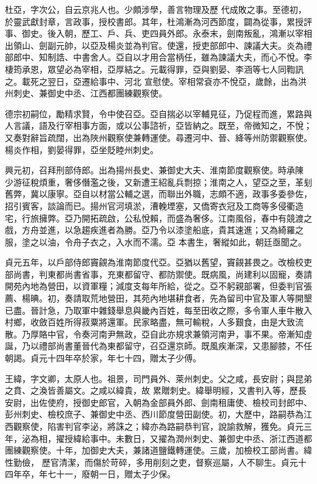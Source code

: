 \begin{pinyinscope}
 杜亞，字次公，自云京兆人也。少頗涉學，善言物理及歷
 代成敗之事。至德初，於靈武獻封章，言政事，授校書郎。其年，杜鴻漸為河西節度，闢為從事，累授評事、御史。後入朝，歷工、戶、兵、吏四員外郎。永泰末，劍南叛亂，鴻漸以宰相出領山、劍副元帥，以亞及楊炎並為判官。使還，授吏部郎中、諫議大夫。炎為禮部郎中、知制誥、中書舍人。亞自以才用合當柄任，雖為諫議大夫，而心不悅。李棲筠承恩，眾望必為宰相，亞厚結之。元載得罪，亞與劉晏、李涵等七人同鞫訊之。載死之翌日，亞遷給事中、河北
 宣慰使。宰相常袞亦不悅亞，歲餘，出為洪州刺史、兼御史中丞、江西都團練觀察使。



 德宗初嗣位，勵精求賢，令中使召亞。亞自揣必以宰輔見征，乃促程而進，累路與人言議，語及行宰相事方面，或以公事諮祈，亞皆納之。既至，帝微知之，不悅；又奏對辭旨疏闊，出為陜州觀察使兼轉運使。尋遷河中、晉、絳等州防禦觀察使。楊炎作相，劉晏得罪，亞坐貶睦州刺史。



 興元初，召拜刑部侍郎。出為揚州長史、兼御史大夫、淮南節度觀察使。時承陳
 少游征稅煩重，奢侈僭濫之後，又新遭王紹亂兵剽掠；淮南之人，望亞之至，革刬舊弊，冀以康寧。亞自以材當公輔之選，而聯出外職，志頗不適，政事多委參佐，招引賓客，談論而已。揚州官河填淤，漕輓堙塞，又僑寄衣冠及工商等多侵衢造宅，行旅擁弊。亞乃開拓疏啟，公私悅賴，而盛為奢侈。江南風俗，春中有競渡之戲，方舟並進，以急趨疾進者為勝。亞乃令以漆塗船底，貴其速進；又為綺羅之服，塗之以油，令舟子衣之，入水而不濡。亞
 本書生，奢縱如此，朝廷亟聞之。



 貞元五年，以戶部侍郎竇覦為淮南節度代亞。亞猶以舊望，竇覦甚畏之。改檢校吏部尚書，判東都尚書省事，充東都留守、都防禦使。既病風，尚建利以固寵，奏請開苑內地為營田，以資軍糧；減度支每年所給，從之。亞不躬親部署，但委判官張薦、楊晪。初，奏請取荒地營田，其苑內地堪耕食者，先為留司中官及軍人等開墾已盡。晉計急，乃取軍中雜錢舉息與畿內百姓，每至田收之際，多令軍人車牛散入
 村鄉，收斂百姓所得菽粟將還軍。民家略盡，無可輸稅，人多艱食，由是大致流散。乃厚賂中官，令奏河南尹無政，亞自此亦規求兼領河南尹，事不果。帝漸知虛誕，乃以禮部尚書董晉代為東都留守，召亞還京師。既風疾漸深，又患腳膝，不任朝謁。貞元十四年卒於家，年七十四，贈太子少傅。



 王緯，字文卿，太原人也。祖景，司門員外、萊州刺史。父之咸，長安尉；與昆弟之賁、之渙皆善屬文。之咸以緯貴，故
 累贈刺史。緯舉明經，又書判入等，歷長安尉，出佐使府，授御史郎官，入朝為金部員外郎、劍南租庸使、檢校司封郎中、彭州刺史、檢校庶子、兼御史中丞、西川節度營田副使。初，大歷中，路嗣恭為江西觀察使，陷害判官李泌，將誅之；緯亦為路嗣恭判官，說諭救解，獲免。貞元三年，泌為相，擢授緯給事中。未數日，又擢為潤州刺史、兼御史中丞、浙江西道都團練觀察使。十年，加御史大夫，兼諸道鹽鐵轉運使。三歲，加檢校工部尚書。緯性勤儉，
 歷官清潔，而傷於苛碎，多用削刻之吏，督察巡屬，人不聊生。貞元十四年卒，年七十一，廢朝一日，贈太子少保。




\end{pinyinscope}
